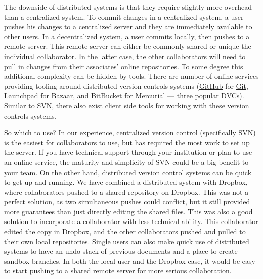 \documentclass[]{article}
\begin{document}
The downside of distributed systems is that they require slightly more
overhead than a centralized system. To commit changes in a centralized system,
a user pushes his changes to a centralized server and they are immediately
available to other users. In a decentralized system, a user commits locally,
then pushes to a remote server. This remote server can either be commonly
shared or unique the individual collaborator. In the latter case, the other
collaborators will need to pull in changes from their associates' online
repositories. To some degree this additional complexity can be hidden by
tools. There are number of online services providing tooling
around distributed version controls systems
(\href{http://www.github.com}{GitHub} for \href{http://git-scm.com/}{Git},
\href{https://launchpad.net/}{Launchpad} for
\href{http://bazaar.canonical.com/en/}{Bazaar}, and
\href{https://bitbucket.org/}{BitBucket} for
\href{http://mercurial.selenic.com/}{Mercurial} --- three popular DVCs).
Similar to SVN, there also exist client side tools for working with these
version controls systems. 

So which to use? In our experience, centralized version control (specifically
SVN) is the easiest for collaborators to use, but has required the most work
to set up the server. If you have technical support through your institution
or plan to use an online service, the maturity and simplicity of SVN could be
a big benefit to your team. On the other hand, distributed version control
systems can be quick to get up and running. We have combined a distributed
system with Dropbox, where collaborators pushed to a shared repository on
Dropbox. This was not a perfect solution, as two simultaneous pushes could
conflict, but it still provided more guarantees than just directly editing the
shared files. This was also a good solution to incorporate a collaborator with
less technical ability. This collaborator edited the copy in Dropbox, and the
other collaborators pushed and pulled to their own local repositories. Single
users can also make quick use of distributed systems to have an undo stack of
previous documents and a place to create sandbox branches. In both the local
user and the Dropbox case, it would be easy to start pushing to a shared
remote server for more serious collaboration.

\end{document}
